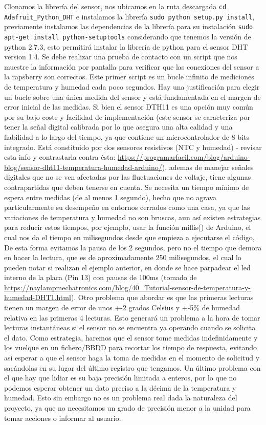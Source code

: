 Clonamos la librería del sensor, nos ubicamos en la ruta descargada \verb|cd Adafruit_Python_DHT| e instalamos la librería \verb|sudo python setup.py install|, previamente instalamos las dependencias de la librería para su instalación \verb|sudo apt-get install python-setuptools| considerando que tenemos la versión de python 2.7.3, esto permitirá instalar la librería de python para el sensor DHT version 1.4. Se debe realizar una prueba de contacto con un script que nos muestre la información por pantalla para verificar que las conexiones del sensor a la rapsberry son correctos. Este primer script es un bucle infinito de mediciones de temperatura y humedad cada poco segundos. Hay una justificación para elegir un bucle sobre una única medida del sensor y está fundamentada en el margen de error inicial de las medidas. Si bien el sensor DTH11 es una opción muy común por su bajo coste y facilidad de implementación (este sensor se caracteriza por tener la señal digital calibrada por lo que asegura una alta calidad y una fiabilidad a lo largo del tiempo, ya que contiene un microcontrolador de 8 bits integrado. Está constituido por dos sensores resistivos (NTC y humedad) - revisar esta info y contrastarla contra ésta: \url{ https://programarfacil.com/blog/arduino-blog/sensor-dht11-temperatura-humedad-arduino/}), ademas de manejar señales digitales que no se ven afectadas por las fluctuaciones de voltaje, tiene algunas contrapartidas que deben tenerse en cuenta. Se necesita un tiempo mínimo de espera entre medidas (de al menos 1 segundo), hecho que no agrava particularmente su desempeño en entornos cerrados como una casa, ya que las variaciones de temperatura y humedad no son bruscas, aun así existen estrategias para reducir estos tiempos, por ejemplo, usar la función millis() de Arduino, el cual nos da el tiempo en milisegundos desde que empieza a ejecutarse el código, De esta forma evitamos la pausa de los 2 segundos, pero no el tiempo que demora en hacer la lectura, que es de aproximadamente  250 milisegundos, el cual lo pueden notar si realizan el ejemplo anterior, en donde se hace parpadear el led interno de la placa (Pin 13) con pausas de 100ms (tomado de \url{https://naylampmechatronics.com/blog/40_Tutorial-sensor-de-temperatura-y-humedad-DHT1.html}). Otro problema que abordar es que las primeras lecturas tienen un margen de error de unos +-2 grados Celsius y +-5\% de humedad relativa en las primeras 4 lecturas. Esto generará un problema a la hora de tomar lecturas instantáneas si el sensor no se encuentra ya operando cuando se solicita el dato. Como estrategia, haremos que el sensor tome medidas indefinidamente y los vuelque en un fichero/BBDD para recortar los tiempo de respuesta, evitando así esperar a que el sensor haga la toma de medidas en el momento de solicitud y sacándolas en su lugar del último registro que tengamos. Un último problema con el que hay que lidiar es su baja precisión limitada a enteros, por lo que no podemos esperar obtener un dato preciso a la décima de la temperatura y humedad. Esto sin embargo no es un problema real dada la naturaleza del proyecto, ya que no necesitamos un grado de precisión menor a la unidad para tomar acciones o informar al usuario.
